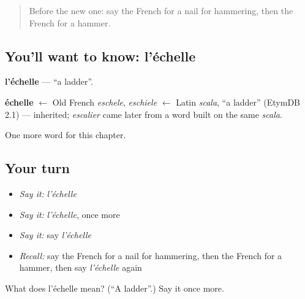 \begin{quote}
Before the new one: say the French for a nail for hammering, then the French for a hammer.
\end{quote}

\subsection*{You'll want to know: l'échelle}
\textbf{l'échelle} — \textquotedblleft{}a ladder\textquotedblright{}.

\begin{cousinweb}
\textbf{échelle} $\leftarrow$ Old French \emph{eschele}, \emph{eschiele} $\leftarrow$ Latin \emph{scala}, \textquotedblleft{}a ladder\textquotedblright{} (EtymDB 2.1) — inherited; \emph{escalier} came later from a word built on the same \emph{scala}.
\end{cousinweb}

\begin{grammarlens}[title={What you've built}]
One more word for this chapter.
\end{grammarlens}

\subsection*{Your turn}
\begin{itemize}
\raggedright
  \item \emph{Say it:} \emph{l'échelle}
  \item \emph{Say it:} \emph{l'échelle}, once more
  \item \emph{Say it:} say \emph{l'échelle}
  \item \emph{Recall:} say the French for a nail for hammering, then the French for a hammer, then say \emph{l'échelle} again
\end{itemize}

\begin{tcolorbox}[breakable,colback=teal!4,colframe=teal!35!black,title={Before you move on}]
What does l'échelle mean? (\textquotedblleft{}A ladder\textquotedblright{}.) Say it once more.
\end{tcolorbox}

